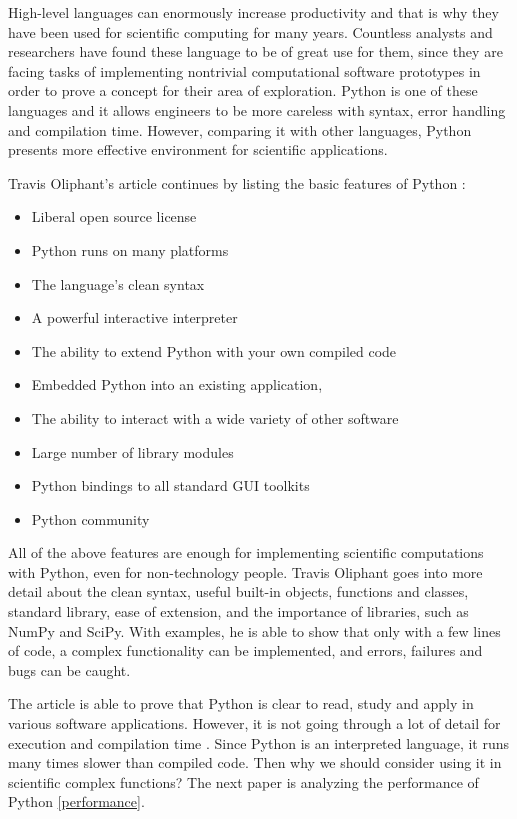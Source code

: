High-level languages can enormously increase productivity and that is why they have been used for scientific computing for many years. Countless analysts and researchers have found these language to be of great use for them, since they are facing tasks of implementing nontrivial computational software prototypes in order to prove a concept for their area of exploration. Python is one of these languages and it allows engineers to be more careless with syntax, error handling and compilation time. However, comparing it with other languages, Python presents more effective environment for scientific applications.

Travis Oliphant's article continues by listing the basic features of Python  \cite{oliphant2007python}:

\begin{itemize}
\item Liberal open source license
\item Python runs on many platforms
\item The language’s clean syntax
\item A powerful interactive interpreter
\item The ability to extend Python with your own compiled code
\item Embedded Python into an existing application,
\item The ability to interact with a wide variety of other software
\item Large number of library modules
\item Python bindings to all standard GUI toolkits
\item Python community
\end{itemize}

All of the above features are enough for implementing scientific computations with Python, even for non-technology people. Travis Oliphant goes into more detail about the clean syntax, useful built-in objects, functions and classes, standard library, ease of extension, and the importance of libraries, such as NumPy and SciPy. With examples, he is able to show that only with a few lines of code, a complex functionality can be implemented, and errors, failures and bugs can be caught. 

The article is able to prove that Python is clear to read, study and apply in various software applications. However, it is not going through a lot of detail for execution and compilation time \cite{HansPython}. Since Python is an interpreted language, it runs many times slower than compiled code. Then why we should consider using it in scientific complex functions? The next paper is analyzing the performance of Python \ref{performance}.

